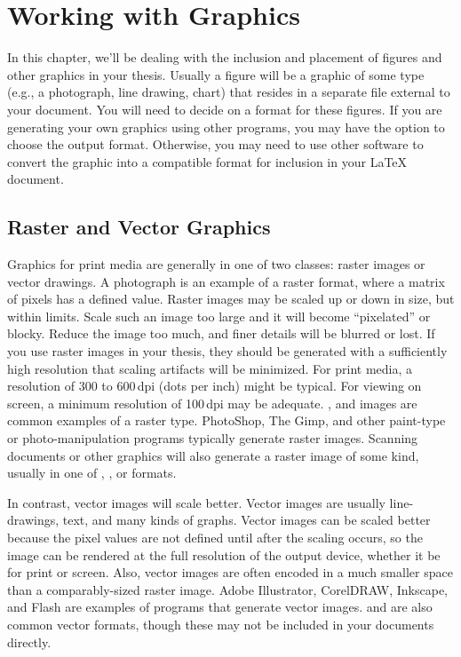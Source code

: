 
\chapter{Working with Graphics}

In this chapter, we'll be dealing with the inclusion and placement of
figures and other graphics in your thesis.  Usually a figure will be a
graphic of some type (e.g., a photograph, line drawing, chart) that
resides in a separate file external to your document.  You will need
to decide on a format for these figures.  If you are generating your
own graphics using other programs, you may have the option to choose
the output format.  Otherwise, you may need to use other software to
convert the graphic into a compatible format for inclusion in your
\LaTeX{} document.

\section{Raster and Vector Graphics}
Graphics for print media are generally in one of two classes: raster
images or vector drawings.  A  photograph is an example of
a raster format, where a matrix of pixels has a defined value.  Raster
images may be scaled up or down in size, but within limits. Scale such
an image too large and it will become ``pixelated'' or blocky.
Reduce the image too much, and finer details will be blurred or lost.
If you use raster images in your thesis, they should be generated with
a sufficiently high resolution that scaling artifacts will be
minimized.  For print media, a resolution of 300 to 600\,dpi (dots per
inch) might be typical.  For viewing on screen, a minimum resolution
of 100\,dpi may be adequate.  ,  and 
images are common examples of a raster type.  PhotoShop, The Gimp, and
other paint-type or photo-manipulation programs typically generate
raster images.  Scanning documents or other graphics will also
generate a raster image of some kind, usually in one of ,
, or  formats.

In contrast, vector images will scale better.  Vector images are
usually line-drawings, text, and many kinds of graphs.  Vector images
can be scaled better because the pixel values are not defined until
after the scaling occurs, so the image can be rendered at the full
resolution of the output device, whether it be for print or screen.
Also, vector images are often encoded in a much smaller space than a
comparably-sized raster image.  Adobe Illustrator, CorelDRAW,
Inkscape, and Flash are examples of programs that generate vector
images.   and  are also common vector formats,
though these may not be included in your documents directly.

